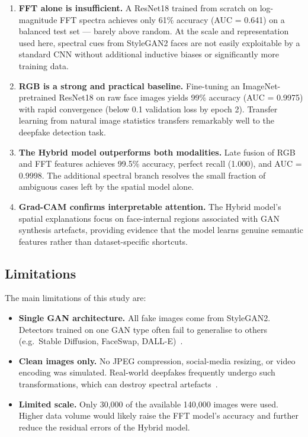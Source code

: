 \documentclass[12pt, a4paper]{article}
\begin{document}
\begin{enumerate}[leftmargin=1.8em]
  \item \textbf{FFT alone is insufficient.}  A ResNet18 trained from scratch
    on log-magnitude FFT spectra achieves only 61\% accuracy (AUC = 0.641) on
    a balanced test set — barely above random.  At the scale and
    representation used here, spectral cues from StyleGAN2 faces are not
    easily exploitable by a standard CNN without additional inductive biases
    or significantly more training data.
  \item \textbf{RGB is a strong and practical baseline.}  Fine-tuning an
    ImageNet-pretrained ResNet18 on raw face images yields 99\% accuracy
    (AUC = 0.9975) with rapid convergence (below 0.1 validation loss by
    epoch 2).  Transfer learning from natural image statistics transfers
    remarkably well to the deepfake detection task.
  \item \textbf{The Hybrid model outperforms both modalities.}  Late fusion
    of RGB and FFT features achieves 99.5\% accuracy, perfect recall
    (1.000), and AUC = 0.9998.  The additional spectral branch resolves the
    small fraction of ambiguous cases left by the spatial model alone.
  \item \textbf{Grad-CAM confirms interpretable attention.}  The Hybrid
    model's spatial explanations focus on face-internal regions associated
    with GAN synthesis artefacts, providing evidence that the model learns
    genuine semantic features rather than dataset-specific shortcuts.
\end{enumerate}

\subsection{Limitations}

The main limitations of this study are:
\begin{itemize}[leftmargin=1.8em]
  \item \textbf{Single GAN architecture.}  All fake images come from
    StyleGAN2.  Detectors trained on one GAN type often fail to generalise
    to others (e.g.\ Stable Diffusion, FaceSwap, DALL-E)~\cite{rossler2019faceforensics}.
  \item \textbf{Clean images only.}  No JPEG compression, social-media
    resizing, or video encoding was simulated.  Real-world deepfakes
    frequently undergo such transformations, which can destroy spectral
    artefacts~\cite{frank2020frequency}.
  \item \textbf{Limited scale.}  Only 30,000 of the available 140,000 images
    were used.  Higher data volume would likely raise the FFT model's
    accuracy and further reduce the residual errors of the Hybrid model.
\end{itemize}
\end{document}

